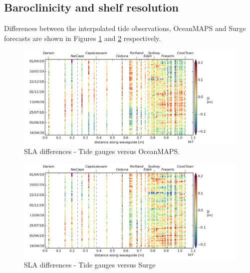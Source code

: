 \subsection{Baroclinicity and shelf resolution}
Differences between the interpolated tide observations, OceanMAPS and Surge forecasts are shown in Figures \ref{fig:diff_tide_omaps} and \ref{fig:diff_tide_surge} respectively.
\newcommand\CAPTIONc{SLA differences from concatenated datasets}
\begin{figure}[!hbt] \centering
    \includegraphics[width=\figwidthFull]{figures/plots/interpTdiff_obs_sla_day0_d0.png}
    \caption{SLA differences - Tide gauges versus OceanMAPS.}
    \label{fig:diff_tide_omaps}
\end{figure}

\begin{figure}[!hbt] \centering
    \includegraphics[width=\figwidthFull]{figures/plots/interpTdiff_obs_surgeg_day0_d0.png}
    \caption{SLA differences - Tide gauges versus Surge}
    \label{fig:diff_tide_surge}
\end{figure}

